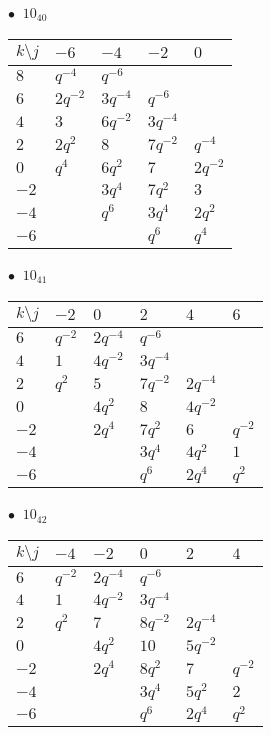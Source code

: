 %
\begin{minipage}{\linewidth}
$\bullet\ $ $10_{40}$ \vspace{0.5em} \\
\begin{tabular}{l|llll}
$k \setminus j$ & $-6$ & $-4$ & $-2$ & $0$ \\
\hline
$8$ & $q^{-4}$ & $q^{-6}$ &  &  \\
$6$ & $2q^{-2}$ & $3q^{-4}$ & $q^{-6}$ &  \\
$4$ & $3$ & $6q^{-2}$ & $3q^{-4}$ &  \\
$2$ & $2q^{2}$ & $8$ & $7q^{-2}$ & $q^{-4}$ \\
$0$ & $q^{4}$ & $6q^{2}$ & $7$ & $2q^{-2}$ \\
$-2$ &  & $3q^{4}$ & $7q^{2}$ & $3$ \\
$-4$ &  & $q^{6}$ & $3q^{4}$ & $2q^{2}$ \\
$-6$ &  &  & $q^{6}$ & $q^{4}$ \\
\end{tabular}
\vspace{2em}
\end{minipage}
%
\begin{minipage}{\linewidth}
$\bullet\ $ $10_{41}$ \vspace{0.5em} \\
\begin{tabular}{l|lllll}
$k \setminus j$ & $-2$ & $0$ & $2$ & $4$ & $6$ \\
\hline
$6$ & $q^{-2}$ & $2q^{-4}$ & $q^{-6}$ &  &  \\
$4$ & $1$ & $4q^{-2}$ & $3q^{-4}$ &  &  \\
$2$ & $q^{2}$ & $5$ & $7q^{-2}$ & $2q^{-4}$ &  \\
$0$ &  & $4q^{2}$ & $8$ & $4q^{-2}$ &  \\
$-2$ &  & $2q^{4}$ & $7q^{2}$ & $6$ & $q^{-2}$ \\
$-4$ &  &  & $3q^{4}$ & $4q^{2}$ & $1$ \\
$-6$ &  &  & $q^{6}$ & $2q^{4}$ & $q^{2}$ \\
\end{tabular}
\vspace{2em}
\end{minipage}
%
\begin{minipage}{\linewidth}
$\bullet\ $ $10_{42}$ \vspace{0.5em} \\
\begin{tabular}{l|lllll}
$k \setminus j$ & $-4$ & $-2$ & $0$ & $2$ & $4$ \\
\hline
$6$ & $q^{-2}$ & $2q^{-4}$ & $q^{-6}$ &  &  \\
$4$ & $1$ & $4q^{-2}$ & $3q^{-4}$ &  &  \\
$2$ & $q^{2}$ & $7$ & $8q^{-2}$ & $2q^{-4}$ &  \\
$0$ &  & $4q^{2}$ & $10$ & $5q^{-2}$ &  \\
$-2$ &  & $2q^{4}$ & $8q^{2}$ & $7$ & $q^{-2}$ \\
$-4$ &  &  & $3q^{4}$ & $5q^{2}$ & $2$ \\
$-6$ &  &  & $q^{6}$ & $2q^{4}$ & $q^{2}$ \\
\end{tabular}
\vspace{2em}
\end{minipage}

